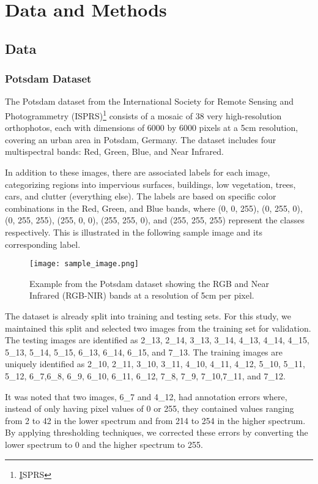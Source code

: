 \chapter{Data and Methods}

\section{Data}
\subsection{Potsdam Dataset}
The Potsdam dataset from the International Society for Remote Sensing and Photogrammetry (ISPRS)\footnote{ \href{https://www.isprs.org/education/benchmarks/UrbanSemLab/2d-sem-label-potsdam.aspx}ISPRS} consists of a mosaic of 38 very high-resolution orthophotos, each with dimensions of 6000 by 6000 pixels at a 5cm resolution, covering an urban area in Potsdam, Germany. The dataset includes four multispectral bands: Red, Green, Blue, and Near Infrared.

In addition to these images, there are associated labels for each image, categorizing regions into impervious surfaces, buildings, low vegetation, trees, cars, and clutter (everything else). The labels are based on specific color combinations in the Red, Green, and Blue bands, where (0, 0, 255), (0, 255, 0), (0, 255, 255), (255, 0, 0), (255, 255, 0), and (255, 255, 255) represent the classes respectively. This is illustrated in the following sample image and its corresponding label.
\begin{figure}[h]
    \centering
    \texttt{[image: sample\_image.png]}
     \caption{Example from the Potsdam dataset showing the RGB and Near Infrared (RGB-NIR) bands at a resolution of 5cm per pixel.}

    \label{fig:sample_label}
\end{figure}

The dataset is already split into training and testing sets. For this study, we maintained this split and selected two images from the training set for validation. The testing images are identified as 2\_13, 2\_14, 3\_13, 3\_14, 4\_13, 4\_14, 4\_15, 5\_13, 5\_14, 5\_15, 6\_13, 6\_14, 6\_15, and 7\_13. The training images are uniquely identified as  2\_10, 2\_11, 3\_10, 3\_11, 4\_10, 4\_11, 4\_12, 5\_10, 5\_11, 5\_12, 6\_7,6\_8, 6\_9, 6\_10, 6\_11, 6\_12, 7\_8, 7\_9, 7\_10,7\_11, and 7\_12.

It was noted that two images, 6\_7 and 4\_12, had annotation errors where, instead of only having pixel values of 0 or 255, they contained values ranging from 2 to 42 in the lower spectrum and from 214 to 254 in the higher spectrum. By applying thresholding techniques, we corrected these errors by converting the lower spectrum to 0 and the higher spectrum to 255.

